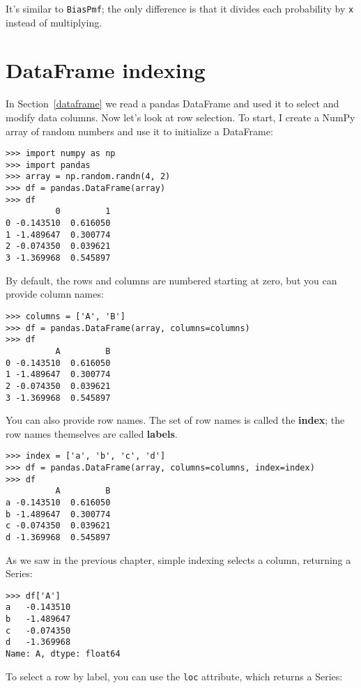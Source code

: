 \documentclass[12pt]{book}
\begin{document}
It's similar to {\tt BiasPmf}; the only difference is that it
divides each probability by {\tt x} instead of multiplying.


\section{DataFrame indexing}

In Section~\ref{dataframe} we read a pandas DataFrame and used it to
select and modify data columns.  Now let's look at row selection.
To start, I create a NumPy array of random numbers and use it
to initialize a DataFrame:

\begin{verbatim}
>>> import numpy as np
>>> import pandas
>>> array = np.random.randn(4, 2)
>>> df = pandas.DataFrame(array)
>>> df
          0         1
0 -0.143510  0.616050
1 -1.489647  0.300774
2 -0.074350  0.039621
3 -1.369968  0.545897
\end{verbatim}

By default, the rows and columns are numbered starting at zero, but
you can provide column names:

\begin{verbatim}
>>> columns = ['A', 'B']
>>> df = pandas.DataFrame(array, columns=columns)
>>> df
          A         B
0 -0.143510  0.616050
1 -1.489647  0.300774
2 -0.074350  0.039621
3 -1.369968  0.545897
\end{verbatim}

You can also provide row names.  The set of row names is called the
{\bf index}; the row names themselves are called {\bf labels}.

\begin{verbatim}
>>> index = ['a', 'b', 'c', 'd']
>>> df = pandas.DataFrame(array, columns=columns, index=index)
>>> df
          A         B
a -0.143510  0.616050
b -1.489647  0.300774
c -0.074350  0.039621
d -1.369968  0.545897
\end{verbatim}

As we saw in the previous chapter, simple indexing selects a
column, returning a Series:

\begin{verbatim}
>>> df['A']
a   -0.143510
b   -1.489647
c   -0.074350
d   -1.369968
Name: A, dtype: float64
\end{verbatim}

To select a row by label, you can use the {\tt loc} attribute, which
returns a Series:
\end{document}
